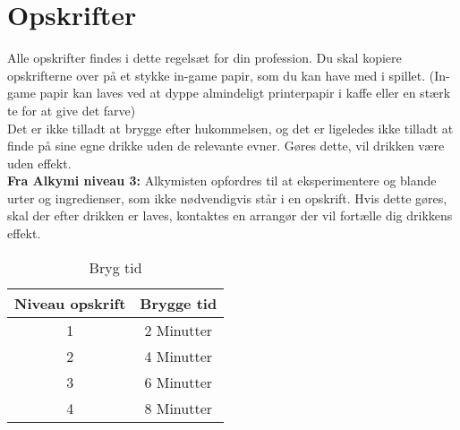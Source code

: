 \chapter*{Opskrifter}
Alle opskrifter findes i dette regelsæt for din profession. Du skal kopiere opskrifterne over på et stykke in-game papir, som du kan have med i spillet. (In-game papir kan laves ved at dyppe almindeligt printerpapir i kaffe eller en stærk te for at give det farve)\\
Det er ikke tilladt at brygge efter hukommelsen, og det er ligeledes ikke tilladt at finde på sine egne drikke uden de relevante evner. Gøres dette, vil drikken være uden effekt.\\
\textbf{Fra Alkymi niveau 3:} Alkymisten opfordres til at eksperimentere og blande urter og ingredienser, som ikke nødvendigvis står i en opskrift. Hvis dette gøres, skal der efter drikken er laves, kontaktes en arrangør der vil fortælle dig drikkens effekt.
\begin{table}[H]
    \centering
    \begin{tabular}{|c|c|}
    \hline
    \rowcolor{cerulean!80}
        Niveau opskrift & Brygge tid \\\hline
        1 & 2 Minutter\\\hline
        2 & 4 Minutter \\\hline
        3 & 6 Minutter \\\hline
        4 & 8 Minutter \\\hline
    \end{tabular}
    \caption{Bryg tid}
    \label{tab:my_label}
\end{table}

